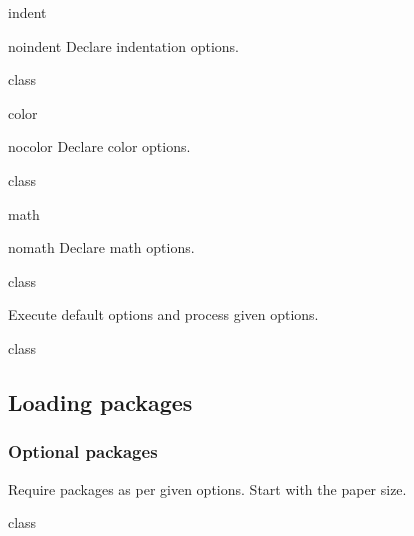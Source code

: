 \documentclass{skdoc}
\begin{document}
	\begin{option}{indent}
	\begin{option}{noindent}
	Declare indentation options.
\begin{MacroCode}{class}
\end{MacroCode}
	\end{option}
	\end{option}

	\begin{option}{color}
	\begin{option}{nocolor}
	Declare color options.
\begin{MacroCode}{class}
\end{MacroCode}
	\end{option}
	\end{option}

	\begin{option}{math}
	\begin{option}{nomath}
	Declare math options.
\begin{MacroCode}{class}
\end{MacroCode}
	\end{option}
	\end{option}

	Execute default options and process given options.
\begin{MacroCode}{class}
\ProcessKeyvalOptions*
\end{MacroCode}

	\subsection{Loading packages}
	\subsubsection{Optional packages}
	Require packages as per given options. Start with the paper size.
\begin{MacroCode}{class}
\end{MacroCode}
\end{document}
